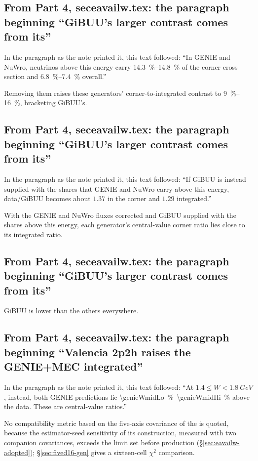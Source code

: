 \subsection{From Part 4, seceavailw.tex: the paragraph beginning ``GiBUU's larger contrast comes from its''}
In the paragraph as the note printed it, this text followed: ``In GENIE and NuWro, neutrinos above this energy carry \SIrange{14.3}{14.8}{\percent} of the corner cross section and \SIrange{6.8}{7.4}{\percent} overall.''\par
Removing them raises these generators' corner-to-integrated contrast to \SIrange{9}{16}{\percent}, bracketing GiBUU's.

\subsection{From Part 4, seceavailw.tex: the paragraph beginning ``GiBUU's larger contrast comes from its''}
In the paragraph as the note printed it, this text followed: ``If GiBUU is instead supplied with the shares that GENIE and NuWro carry above this energy, data/GiBUU becomes about $1.37$ in the corner and $1.29$ integrated.''\par
With the GENIE and NuWro fluxes corrected and GiBUU supplied with the shares above this energy, each generator's central-value corner ratio lies close to its integrated ratio.

\subsection{From Part 4, seceavailw.tex: the paragraph beginning ``GiBUU's larger contrast comes from its''}
GiBUU is lower than the others everywhere.

\subsection{From Part 4, seceavailw.tex: the paragraph beginning ``Valencia 2p2h raises the GENIE+MEC integrated''}
In the paragraph as the note printed it, this text followed: ``At $1.4\le W<\SI{1.8}{GeV}$, instead, both GENIE predictions lie \SIrange{\genieWmidLo}{\genieWmidHi}{\percent} above the data. These are central-value ratios.''\par
No compatibility metric based on the five-axis covariance of the \resFiveAxis{} is quoted, because the estimator-seed sensitivity of its construction, measured with two companion covariances, exceeds the limit set before production (\S\ref{sec:eavailw-adopted}); \S\ref{sec:fived16-gen} gives a sixteen-cell $\chi^{2}$ comparison.

